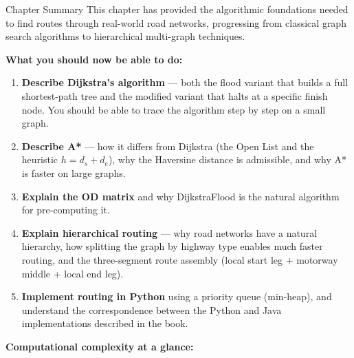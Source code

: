 \documentclass[aspectratio=169,10pt]{beamer}
\begin{document}
\begin{frame}[allowframebreaks]{Chapter Summary}
  This chapter has provided the algorithmic foundations needed to find
  routes through real-world road networks, progressing from classical graph
  search algorithms to hierarchical multi-graph techniques.

  \medskip
  \textbf{What you should now be able to do:}

  \begin{enumerate}
    \item \textbf{Describe Dijkstra's algorithm} --- both the flood variant
      that builds a full shortest-path tree and the modified variant that
      halts at a specific finish node.  You should be able to trace the
      algorithm step by step on a small graph.

    \item \textbf{Describe A*} --- how it differs from Dijkstra
      (the Open List and the heuristic $h = d_s + d_e$), why the Haversine
      distance is admissible, and why A* is faster on large graphs.

    \item \textbf{Explain the OD matrix} and why DijkstraFlood is the
      natural algorithm for pre-computing it.

    \item \textbf{Explain hierarchical routing} --- why road networks
      have a natural hierarchy, how splitting the graph by highway type
      enables much faster routing, and the three-segment route assembly
      (local start leg + motorway middle + local end leg).

    \item \textbf{Implement routing in Python} using a priority queue
      (min-heap), and understand the correspondence between the Python
      and Java implementations described in the book.
  \end{enumerate}

  \framebreak

  \textbf{Computational complexity at a glance:}


\end{frame}
\end{document}
